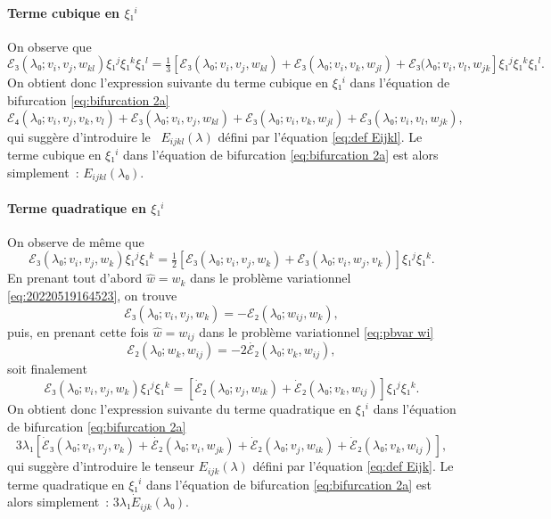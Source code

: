 \documentclass[12pt, final]{amsart}
\theoremstyle{definition}
\begin{document}
\paragraph{Terme cubique en \(ξ₁^i\)}On observe que
\begin{equation} ℰ₃(λ₀ ; v_i, v_j, w_{k l}) ξ₁^j ξ₁^k
  ξ₁^l = \text{} \tfrac{1}{3} [ℰ₃(λ₀ ; v_i, v_j, w_{k
  l}) +ℰ₃(λ₀ ; v_i, v_k, w_{j
  l}) +ℰ₃(λ₀ ; v_i, v_l, w_{j k}] ξ₁^j ξ₁^k
  ξ₁^l . \end{equation}
On obtient donc l'expression suivante du terme cubique en \(ξ₁^i\) dans l'équation de bifurcation \eqref{eq:bifurcation 2a}
\begin{equation} ℰ₄(λ₀ ; v_i, v_j, v_k, v_l) +ℰ₃(λ₀ ;
  v_i, v_j, w_{k l}) +ℰ₃(λ₀ ; v_i, v_k, w_{j
  l}) +ℰ₃(λ₀ ; v_i, v_l, w_{j k}), \end{equation}
qui suggère d'introduire le \ \(E_{i j k l}(λ)\) défini par l'équation \eqref{eq:def Eijkl}. Le terme cubique en \(ξ₁^i\) dans l'équation de bifurcation \eqref{eq:bifurcation 2a} est alors simplement~: \(E_{i j k l}(λ₀)\).

\paragraph{Terme quadratique en \(ξ₁^i\)}On observe de même que
\begin{equation} ℰ₃(λ₀ ; v_i, v_j, w_k) ξ₁^j ξ₁^k = \tfrac{1}{2}
  [ℰ₃(λ₀ ; v_i, v_j, w_k) +ℰ₃(λ₀ ; v_i,
  w_j, v_k)] ξ₁^j ξ₁^k . \end{equation}
En prenant tout d'abord \(\widehat{w} = w_k\) dans le problème variationnel \eqref{eq:20220519164523}, on trouve
\begin{equation} ℰ₃(λ₀ ; v_i, v_j, w_k) = -ℰ₂(λ₀ ;
  w_{i j}, w_k), \end{equation}
puis, en prenant cette fois \(\hat{w} = w_{i j}\) dans le problème variationnel \eqref{eq:pbvar wi}
\begin{equation} ℰ₂(λ₀ ; w_k, w_{i j}) = - 2 \dot{ℰ₂}
 (λ₀ ; v_k, w_{i j}), \end{equation}
soit finalement
\begin{equation} ℰ₃(λ₀ ; v_i, v_j, w_k) ξ₁^j ξ₁^k =
  [\dot{ℰ}₂(λ₀ ; v_j, w_{i k}) +
  \dot{ℰ}₂(λ₀ ; v_k, w_{i j})] ξ₁^j ξ₁^k .
\end{equation}
On obtient donc l'expression suivante du terme quadratique en \(ξ₁^i\) dans l'équation de bifurcation \eqref{eq:bifurcation 2a}
\begin{equation} 3 λ₁ [\dot{ℰ}₃(λ₀ ; v_i, v_j, v_k) +
  \dot{ℰ₂}(λ₀ ; v_i, w_{j k}) +
  \dot{ℰ}₂(λ₀ ; v_j, w_{i k}) +
  \dot{ℰ}₂(λ₀ ; v_k, w_{i j})], \end{equation}
qui suggère d'introduire le tenseur \(E_{i j k}(λ)\) défini par l'équation \eqref{eq:def Eijk}. Le terme quadratique en \(ξ₁^i\) dans l'équation de bifurcation \eqref{eq:bifurcation 2a} est alors simplement~: \(3 λ₁ \dot{E}_{i j k}(λ₀)\).
\end{document}
